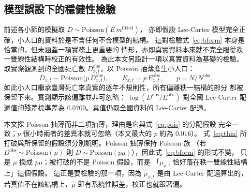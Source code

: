 \documentclass[UTF8, fontset=macnew, a4paper, 12pt]{ctexart}
\begin{document}
\subsection{模型誤設下的穩健性檢驗}\label{sec:real}

前述各小節的模擬取 $D\sim\text{Poisson}(E\,m^{\text{fitted}})$，
亦即假設 Lee-Carter 模型完全正確，小人口的資料於是不含任何不合模型的結構。
這對檢驗式~\eqref{eq:bform} 本身是恰當的，但未涵蓋一項實務上更重要的
情形，亦即真實資料本來就不完全服從秩一雙線性結構時校正的有效性。
為此本文另設計一項以真實資料為基礎的檢驗。取實際觀測到的全國死亡數
$D^{\text{obs}}_{x,t}$，以 Poisson 抽薄產生小人口：
\begin{equation}\label{eq:thin}
D_{x,t}\sim\text{Poisson}\big(p\,D^{\text{obs}}_{x,t}\big),\qquad
E_{x,t}=p\,E^{\text{obs}}_{x,t},\qquad p=N/N^{\text{obs}} .
\end{equation}
如此小人口繼承臺灣死亡率真實的逐年不規則性，所有偏離秩一結構的部分
都被保留下來。實測顯示該偏離並非可忽略：
$\log(D^{\text{obs}}/E^{\text{obs}})$ 對全國 Lee-Carter 配適值的殘差標準差為
$0.0700$。真值仍取全國資料的 Lee-Carter 配適。

本文採 Poisson 抽薄而非二項抽薄，理由是它與式~\eqref{eq:pois} 的分配假設
完全一致；$p$ 很小時兩者的差異本就可忽略（本文最大的 $p$ 約為 $0.016$）。
式~\eqref{eq:thin} 所打破與所保留的假設須分別說明。Poisson 抽薄保持 Poisson 族
（若 $D^{\text{obs}}\sim\text{Poisson}(\mu)$ 則
$D\sim\text{Poisson}(p\mu)$），因此式~\eqref{eq:bform} 的形式不變，
只是 $\mu$ 換成 $p\mu$；被打破的不是 Poisson 假設，而是
「$\mu_{x,t}$ 恰好落在秩一雙線性結構上」這個假設。
這正是要檢驗的那一項，因為 $\hat\mu_{x,t}$ 是由 Lee-Carter 配適算出的，
若真值不在該結構上，$\hat\mu$ 即有系統性誤差，校正也就跟著偏。
\end{document}
